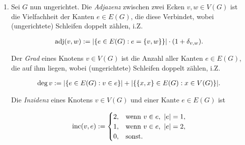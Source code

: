 \begin{definition}
\begin{enumerate}[
                wide,
                labelindent = 0pt
            ]
                \item Sei $G$ nun ungerichtet.
                Die \textit{Adjazenz} zwischen zwei Ecken $v, w \in V(G)$ ist die Vielfachheit der Kanten $e \in E(G)$, die diese Verbindet, wobei (ungerichtete) Schleifen doppelt zählen, i.Z.

                \begin{align*}
                    \operatorname{adj}(v, w)
                    :=
                    |{\left \{ e \in E(G): e = {\left \{ v, w \right \}} \right \}}| \cdot (1 + \delta_{v, w}).
                \end{align*}

                Der \textit{Grad} eines Knotens $v \in V(G)$ ist die Anzahl aller Kanten $e \in E(G)$, die auf ihm liegen, wobei (ungerichtete) Schleifen doppelt zählen, i.Z.

                \begin{align*}
                    \deg v
                    :=
                    |{\left \{ e \in E(G): v \in e \right \}}|
                    +
                    |{\left \{ {\left \{ x, x \right \}} \in E(G): x \in V(G) \right \}}|.
                \end{align*}

                Die \textit{Inzidenz} eines Knotens $v \in V(G)$ und einer Kante $e \in E(G)$ ist

                \begin{align*}
                    \operatorname{inc}(v, e)
                    :=
                    \begin{cases}
                        2, & \text{wenn}~ v \in e, ~ |e| = 1, \\
                        1, & \text{wenn}~ v \in e, ~ |e| = 2, \\
                        0, & \text{sonst}.
                    \end{cases}
                \end{align*}

            \end{enumerate}

        \end{definition}

